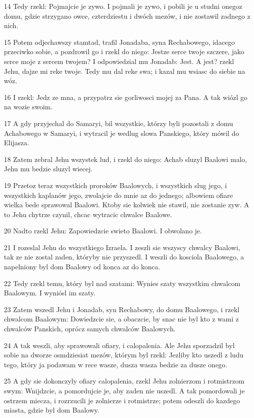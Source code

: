 \par 14 Tedy rzekl: Pojmajcie je zywo. I pojmali je zywo, i pobili je u studni onegoz domu, gdzie strzygano owce, czterdziestu i dwóch mezów, i nie zostawil zadnego z nich.
\par 15 Potem odjechawszy stamtad, trafil Jonadaba, syna Rechabowego, idacego przeciwko sobie, a pozdrowil go i rzekl do niego: Jestze serce twoje szczere, jako serce moje z sercem twojem? I odpowiedzial mu Jonadab: Jest. A jest? rzekl Jehu, dajze mi reke twoje. Tedy mu dal reke swa; i kazal mu wsiasc do siebie na wóz.
\par 16 I rzekl: Jedz ze mna, a przypatrz sie gorliwosci mojej za Pana. A tak wiózl go na wozie swoim.
\par 17 A gdy przyjechal do Samaryi, bil wszystkie, którzy byli pozostali z domu Achabowego w Samaryi, i wytracil je wedlug slowa Panskiego, który mówil do Elijasza.
\par 18 Zatem zebral Jehu wszystek lud, i rzekl do niego: Achab sluzyl Baalowi malo, Jehu mu bedzie sluzyl wiecej.
\par 19 Przetoz teraz wszystkich proroków Baalowych, i wszystkich slug jego, i wszystkich kaplanów jego, zwolajcie do mnie az do jednego; albowiem ofiare wielka bede sprawowal Baalowi. Ktoby sie kolwiek nie stawil, nie zostanie zyw. A to Jehu chytrze czynil, chcac wytracic chwalce Baalowe.
\par 20 Nadto rzekl Jehu: Zapowiedzcie swieto Baalowi. I obwolano je.
\par 21 I rozeslal Jehu do wszystkiego Izraela. I zeszli sie wszyscy chwalcy Baalowi, tak ze nie zostal zaden, któryby nie przyszedl. I weszli do kosciola Baalowego, a napelniony byl dom Baalowy od konca az do konca.
\par 22 Tedy rzekl temu, który byl nad szatami: Wynies szaty wszystkim chwalcom Baalowym. I wyniósl im szaty.
\par 23 Zatem wszedl Jehu i Jonadab, syn Rechabowy, do domu Baalowego, i rzekl chwalcom Baalowym: Dowiedzcie sie, a obaczcie, by snac nie byl kto z wami z chwalców Panskich, oprócz samych chwalców Baalowych.
\par 24 A tak weszli, aby sprawowali ofiary, i calopalenia. Ale Jehu sporzadzil byl sobie na dworze osmdziesiat mezów, którym byl rzekl: Jezliby kto uszedl z ludu tego, który ja podawam w rece wasze, dusza wasza bedzie za dusze onego.
\par 25 A gdy sie dokonczyly ofiary calopalenia, rzekl Jehu zolnierzom i rotmistrzom swym: Wnijdzcie, a pomordujcie je, aby zaden nie uszedl. A tak pomordowali je ostrzem miecza, i rozrzucili je zolnierze i rotmistrze; potem odeszli do kazdego miasta, gdzie byl dom Baalowy.
